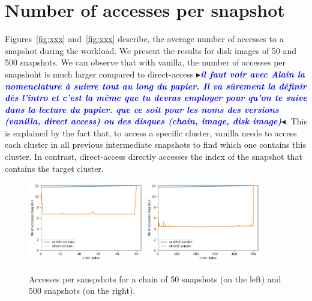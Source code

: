 \documentclass[sigplan,screen,10pt]{acmart}
\newcommand{\mynote}[2]{\fbox{\bfseries\sffamily\footnotesize{\textbf{#1}}}
 {\small$\blacktriangleright$\textsf{\emph{#2}}$\blacktriangleleft$}}
\newcommand{\mynote}[2]{}
\newcommand{\stella}[1]{\mynote{\textcolor{red}{Stella}}{\textcolor{blue}{\textbf{#1}}}}
\begin{document}
	\section*{Number of accesses per snapshot}
	
	Figures~\ref{fig:xxx} and~\ref{fig:xxx} describe, the average number of accesses to a snapshot during the workload.
	We present the results for disk images of 50 and 500 snapshots.
	We can observe that with vanilla, the number of accesses per snapshoht is much larger compared to direct-access \stella{il faut voir avec Alain la nomenclature à suivre tout au long du papier. Il va sûrement la définir dès l'intro et c'est la même que tu devras employer pour qu'on te suive dans la lecture du papier. que ce soit pour les noms des versions (vanilla, direct access) ou des disques (chain, image, disk image)}.
	This is explained by the fact that, to access a specific cluster, vanilla needs to access each cluster in all previous intermediate snapshots to find which one contains this cluster.
	In contrast, direct-access directly accesses the index of the snapshot that contains the target cluster.
	
	\begin{figure}[h]
		\center
		\includegraphics[width=0.45\textwidth]{clusters_accesses_chain_50.pdf}
		\includegraphics[width=0.45\textwidth]{clusters_accesses_chain_500.pdf}
		\caption{Accesses per sanspshots for a chain of 50 snapshots (on the left) and 500 snapshots (on the right).}
		\label{fig:fig2}
	\end{figure}
\end{document}
